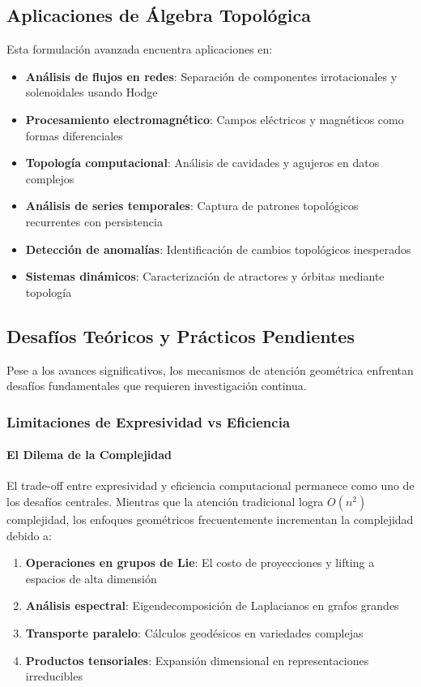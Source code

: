 \subsection{Aplicaciones de Álgebra Topológica}

Esta formulación avanzada encuentra aplicaciones en:

\begin{itemize}
    \item \textbf{Análisis de flujos en redes}: Separación de componentes irrotacionales y solenoidales usando Hodge
    \item \textbf{Procesamiento electromagnético}: Campos eléctricos y magnéticos como formas diferenciales
    \item \textbf{Topología computacional}: Análisis de cavidades y agujeros en datos complejos
    \item \textbf{Análisis de series temporales}: Captura de patrones topológicos recurrentes con persistencia
    \item \textbf{Detección de anomalías}: Identificación de cambios topológicos inesperados
    \item \textbf{Sistemas dinámicos}: Caracterización de atractores y órbitas mediante topología
\end{itemize}


\subsection{Desafíos Teóricos y Prácticos Pendientes}

Pese a los avances significativos, los mecanismos de atención geométrica enfrentan desafíos fundamentales que requieren investigación continua.

\subsubsection{Limitaciones de Expresividad vs Eficiencia}

\paragraph{El Dilema de la Complejidad}

El trade-off entre expresividad y eficiencia computacional permanece como uno de los desafíos centrales. Mientras que la atención tradicional logra $O(n^2)$ complejidad, los enfoques geométricos frecuentemente incrementan la complejidad debido a:

\begin{enumerate}
    \item \textbf{Operaciones en grupos de Lie}: El costo de proyecciones y lifting a espacios de alta dimensión
    \item \textbf{Análisis espectral}: Eigendecomposición de Laplacianos en grafos grandes
    \item \textbf{Transporte paralelo}: Cálculos geodésicos en variedades complejas
    \item \textbf{Productos tensoriales}: Expansión dimensional en representaciones irreducibles
\end{enumerate}

